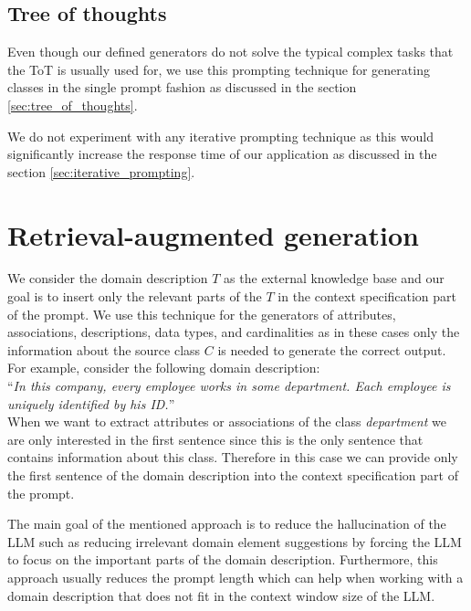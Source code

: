 \subsection{Tree of thoughts}

Even though our defined generators do not solve the typical complex tasks that the ToT is usually used for, we use this prompting technique for generating classes in the single prompt fashion as discussed in the section \ref{sec:tree_of_thoughts}.

We do not experiment with any iterative prompting technique as this would significantly increase the response time of our application as discussed in the section \ref{sec:iterative_prompting}.



\section{Retrieval-augmented generation}

We consider the domain description $T$ as the external knowledge base and our goal is to insert only the relevant parts of the $T$ in the context specification part of the prompt. We use this technique for the generators of attributes, associations, descriptions, data types, and cardinalities as in these cases only the information about the source class $C$ is needed to generate the correct output. For example, consider the following domain description: \\

\noindent{}``\textit{In this company, every employee works in some department. Each employee is uniquely identified by his ID.}''\\

\noindent{}When we want to extract attributes or associations of the class \textit{department} we are only interested in the first sentence since this is the only sentence that contains information about this class. Therefore in this case we can provide only the first sentence of the domain description into the context specification part of the prompt.

The main goal of the mentioned approach is to reduce the hallucination of the LLM such as reducing irrelevant domain element suggestions by forcing the LLM to focus on the important parts of the domain description. Furthermore, this approach usually reduces the prompt length which can help when working with a domain description that does not fit in the context window size of the LLM.


